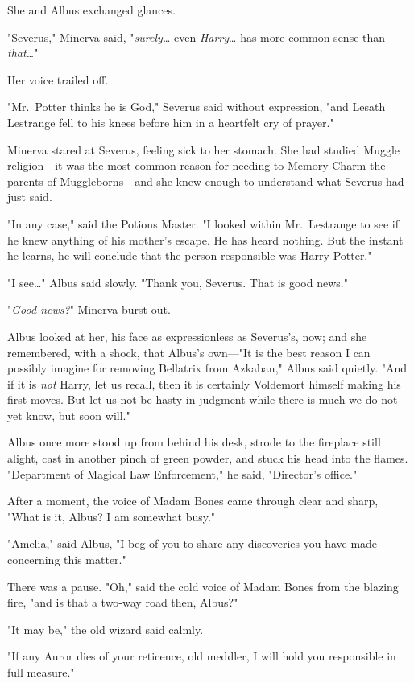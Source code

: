 She and Albus exchanged glances.

"Severus," Minerva said, "\emph{surely{\ldots}} even \emph{Harry}{\ldots} has
more common sense than \emph{that{\ldots}}"

Her voice trailed off.

"Mr.~Potter thinks he is God," Severus said without expression, "and Lesath
Lestrange fell to his knees before him in a heartfelt cry of prayer."

Minerva stared at Severus, feeling sick to her stomach. She had studied Muggle
religion---it was the most common reason for needing to Memory-Charm the
parents of Muggleborns---and she knew enough to understand what Severus had
just said.

"In any case," said the Potions Master. "I looked within Mr.~Lestrange to see
if he knew anything of his mother's escape. He has heard nothing. But the
instant he learns, he will conclude that the person responsible was Harry
Potter."

"I see{\ldots}" Albus said slowly. "Thank you, Severus. That is good news."

"\emph{Good news?}" Minerva burst out.

Albus looked at her, his face as expressionless as Severus's, now; and she
remembered, with a shock, that Albus's own---"It is the best reason I can
possibly imagine for removing Bellatrix from Azkaban," Albus said quietly. "And
if it is \emph{not} Harry, let us recall, then it is certainly Voldemort
himself making his first moves. But let us not be hasty in judgment while there
is much we do not yet know, but soon will."

Albus once more stood up from behind his desk, strode to the fireplace still
alight, cast in another pinch of green powder, and stuck his head into the
flames. "Department of Magical Law Enforcement," he said, "Director's office."

After a moment, the voice of Madam Bones came through clear and sharp, "What is
it, Albus? I am somewhat busy."

"Amelia," said Albus, "I beg of you to share any discoveries you have made
concerning this matter."

There was a pause. "Oh," said the cold voice of Madam Bones from the blazing
fire, "and is that a two-way road then, Albus?"

"It may be," the old wizard said calmly.

"If any Auror dies of your reticence, old meddler, I will hold you responsible
in full measure."

